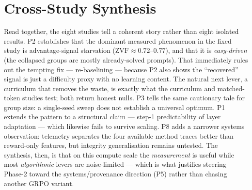 \documentclass[12pt,a4paper]{report}
\newcommand{\zvf}{\mathrm{ZVF}}
\begin{document}
\section{Cross-Study Synthesis}
Read together, the eight studies tell a coherent story rather than eight isolated
results. P2 establishes that the dominant measured phenomenon in the fixed study is
advantage-signal starvation
($\zvf\approx0.72$--$0.77$), and that it is \emph{easy-driven} (the collapsed groups
are mostly already-solved prompts). That immediately rules out the tempting fix ---
re-baselining --- because P2 also shows the ``recovered'' signal is just a difficulty
proxy with no learning content. The natural next lever, a curriculum that removes the
waste, is exactly what the curriculum and matched-token studies test; both return
honest nulls. P3 tells the same cautionary tale for group size: a single-seed sweep
does not establish a universal optimum. P1 extends
the pattern to a structural claim --- step-1 predictability of layer adaptation ---
which likewise fails to survive scaling. P8 adds a narrower systems observation:
telemetry separates the four available method traces better than reward-only features,
but integrity generalisation remains untested. The synthesis, then, is that on this
compute scale the \emph{measurement} is useful while most
\emph{algorithmic} levers are noise-limited --- which is what justifies steering
Phase-2 toward the systems/provenance direction (P5) rather than chasing another
GRPO variant.
\end{document}
